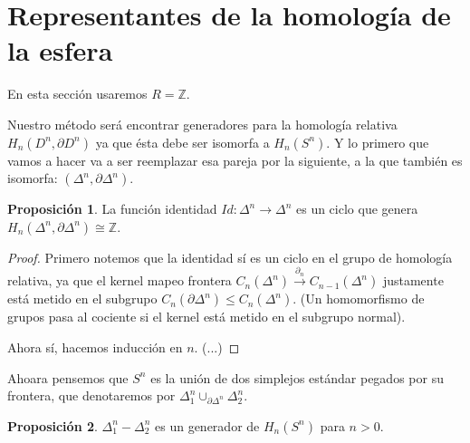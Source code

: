 \documentclass[spanish]{book}
\theoremstyle{definition}
\newtheorem*{prop}{Proposición}
\newcommand{\Z}{\mathbb{Z}}
\begin{document}
\section{Representantes de la homología de la esfera}
	En esta sección usaremos $R=\mathbb Z$. 
	
	Nuestro método será encontrar generadores para la homología relativa $H_n(D^n,\partial D^n)$ ya que ésta debe ser isomorfa a $H_n(S^n)$. Y lo primero que vamos a hacer va a ser reemplazar esa pareja por la siguiente, a la que también es isomorfa: $(\Delta^n,\partial\Delta^n)$.
\begin{prop}
	 La función identidad $Id:\Delta^n\to\Delta^n$ es un ciclo que genera $H_n(\Delta^n,\partial\Delta^n)\cong\Z$.
	 \begin{proof}
	 	Primero notemos que la identidad sí es un ciclo en el grupo de homología relativa, ya que el kernel mapeo frontera $C_n(\Delta^n)\xrightarrow{\partial_n}C_{n-1}(\Delta^n)$ justamente está metido en el subgrupo $C_n(\partial\Delta^n)\leq C_n(\Delta^n)$. (Un homomorfismo de grupos pasa al cociente si el kernel está metido en el subgrupo normal).
	 	
	 	Ahora sí, hacemos inducción en $n$. (...)
	 	
%	 	
%	 	
	 \end{proof}
\end{prop}
	Ahoara pensemos que $S^n$ es la unión de dos simplejos estándar pegados por su frontera, que denotaremos por $\Delta_1^n\cup_{\partial\Delta^n}\Delta_2^n$.
\begin{prop}
	$\Delta^n_1-\Delta^n_2$ es un generador de $H_n(S^n)$ para $n>0$.
\end{prop}
\end{document}
